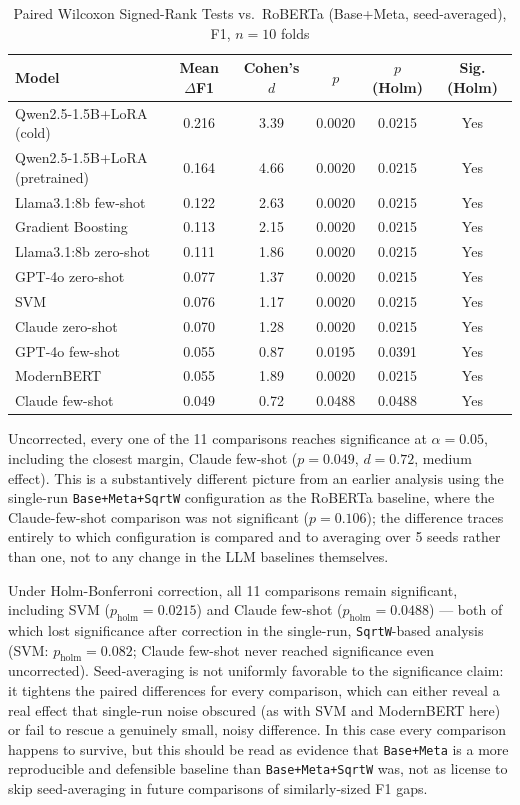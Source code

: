 \documentclass[preprint,12pt]{elsarticle}
\begin{document}
\begin{table}[t]
\centering
\footnotesize
\setlength{\tabcolsep}{3pt}
\begin{tabular}{lccccc}
\toprule
\textbf{Model} & \textbf{Mean $\Delta$F1} & \textbf{Cohen's $d$} & \textbf{$p$} & \textbf{$p$ (Holm)} & \textbf{Sig. (Holm)} \\
\midrule
Qwen2.5-1.5B+LoRA (cold) & 0.216 & 3.39 & 0.0020 & 0.0215 & Yes \\
Qwen2.5-1.5B+LoRA (pretrained) & 0.164 & 4.66 & 0.0020 & 0.0215 & Yes \\
Llama3.1:8b few-shot & 0.122 & 2.63 & 0.0020 & 0.0215 & Yes \\
Gradient Boosting & 0.113 & 2.15 & 0.0020 & 0.0215 & Yes \\
Llama3.1:8b zero-shot & 0.111 & 1.86 & 0.0020 & 0.0215 & Yes \\
GPT-4o zero-shot & 0.077 & 1.37 & 0.0020 & 0.0215 & Yes \\
SVM & 0.076 & 1.17 & 0.0020 & 0.0215 & Yes \\
Claude zero-shot & 0.070 & 1.28 & 0.0020 & 0.0215 & Yes \\
GPT-4o few-shot & 0.055 & 0.87 & 0.0195 & 0.0391 & Yes \\
ModernBERT & 0.055 & 1.89 & 0.0020 & 0.0215 & Yes \\
Claude few-shot & 0.049 & 0.72 & 0.0488 & 0.0488 & Yes \\
\bottomrule
\end{tabular}
\caption{Paired Wilcoxon Signed-Rank Tests vs.\ RoBERTa (Base+Meta, seed-averaged), F1, $n=10$ folds}
\label{tab:significance}
\end{table}

Uncorrected, every one of the 11 comparisons reaches significance at $\alpha=0.05$, including the closest margin, Claude few-shot ($p=0.049$, $d=0.72$, medium effect). This is a substantively different picture from an earlier analysis using the single-run \texttt{Base+Meta+SqrtW} configuration as the RoBERTa baseline, where the Claude-few-shot comparison was not significant ($p=0.106$); the difference traces entirely to which configuration is compared and to averaging over 5 seeds rather than one, not to any change in the LLM baselines themselves.

Under Holm-Bonferroni correction, all 11 comparisons remain significant, including SVM ($p_{\text{holm}}=0.0215$) and Claude few-shot ($p_{\text{holm}}=0.0488$) — both of which lost significance after correction in the single-run, \texttt{SqrtW}-based analysis (SVM: $p_{\text{holm}}=0.082$; Claude few-shot never reached significance even uncorrected). Seed-averaging is not uniformly favorable to the significance claim: it tightens the paired differences for every comparison, which can either reveal a real effect that single-run noise obscured (as with SVM and ModernBERT here) or fail to rescue a genuinely small, noisy difference. In this case every comparison happens to survive, but this should be read as evidence that \texttt{Base+Meta} is a more reproducible and defensible baseline than \texttt{Base+Meta+SqrtW} was, not as license to skip seed-averaging in future comparisons of similarly-sized F1 gaps.
\end{document}
